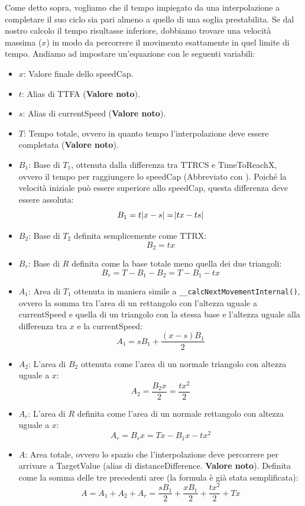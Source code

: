 \documentclass[main.tex]{subfiles}
\begin{document}
Come detto sopra, vogliamo che il tempo impiegato da una interpolazione a completare il suo ciclo sia pari almeno a quello di una soglia prestabilita. Se dal nostro calcolo il tempo risultasse inferiore, dobbiamo trovare una velocità massima ($x$) in modo da percorrere il movimento esattamente in quel limite di tempo. Andiamo ad impostare un'equazione con le seguenti variabili:
\begin{itemize}
    \item $x$: Valore finale dello speedCap.
    \item $t$: Alias di TTFA (\textbf{Valore noto}).
    \item $s$: Alias di currentSpeed (\textbf{Valore noto}).
    \item $T$: Tempo totale, ovvero in quanto tempo l'interpolazione deve essere completata (\textbf{Valore noto}).
    \item $B_1$: Base di $T_1$, ottenuta dalla differenza tra TTRCS e TimeToReachX, ovvero il tempo per raggiungere lo speedCap (Abbreviato con ). Poiché la velocità iniziale può essere superiore allo speedCap, questa differenza deve essere assoluta: \[B_1 = t\abs{x - s} = \abs{tx - ts}\]
    \item $B_2$: Base di $T_2$ definita semplicemente come TTRX: \[B_2 = tx\]
    \item $B_r$: Base di $R$ definita come la base totale meno quella dei due triangoli: \[B_r = T - B_1 - B_2 = T - B_1 - tx\]
    \item $A_1$: Area di $T_1$ ottenuta in maniera simile a \lstinline{__calcNextMovementInternal()}, ovvero la somma tra l'area di un rettangolo con l'altezza uguale a currentSpeed e quella di un triangolo con la stessa base e l'altezza uguale alla differenza tra $x$ e la currentSpeed: \[A_1 = sB_1 + \frac{(x - s)B_1}{2}\]
    \item $A_2$: L'area di $B_2$ ottenuta come l'area di un normale triangolo con altezza uguale a $x$: \[A_2 = \frac{B_2x}{2} = \frac{tx^2}{2}\]
    \item $A_r$: L'area di $R$ definita come l'area di un normale rettangolo con altezza uguale a $x$: \[A_r = B_rx = Tx - B_1x - tx^2\]
    \item $A$: Area totale, ovvero lo spazio che l'interpolazione deve percorrere per arrivare a TargetValue (alias di distanceDifference. \textbf{Valore noto}). Definita come la somma delle tre precedenti aree (la formula è già stata semplificata): \[A = A_1 + A_2 + A_r = \frac{sB_1}{2} + \frac{xB_1}{2} + \frac{tx^2}{2} + Tx\]
\end{itemize}
\end{document}
